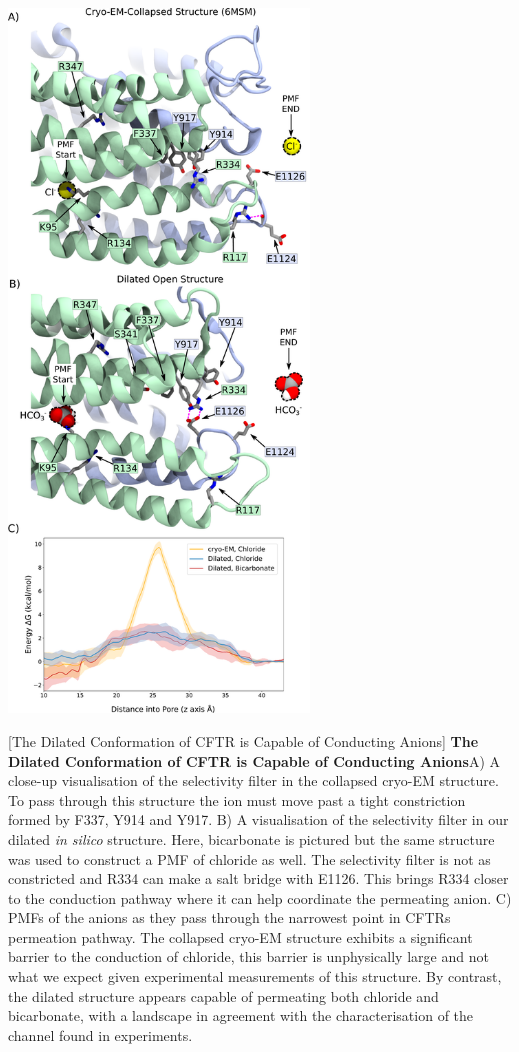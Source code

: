	\begin{center}
		\includegraphics[width=0.6\textwidth]{figures/opening/pmf_fig_1_combined.pdf}
	\end{center}
\begingroup

	\captionsetup{singlelinecheck = false, justification=raggedright}
	[The Dilated Conformation of CFTR is Capable of Conducting Anions] {\textbf{The Dilated Conformation of CFTR is Capable of Conducting Anions}}{A) A close-up visualisation of the selectivity filter in the collapsed cryo-EM structure. To pass through this structure the ion must move past a tight constriction formed by F337, Y914 and Y917. B) A visualisation of the selectivity filter in our dilated \textit{in silico} structure. Here, bicarbonate is pictured but the same structure was used to construct a PMF of chloride as well. The selectivity filter is not as constricted and R334 can make a salt bridge with E1126. This brings R334 closer to the conduction pathway where it can help coordinate the permeating anion. C) PMFs of the anions as they pass through the narrowest point in CFTRs permeation pathway. The collapsed cryo-EM structure exhibits a significant barrier to the conduction of chloride, this barrier is unphysically large and not what we expect given experimental measurements of this structure. By contrast, the dilated structure appears capable of permeating both chloride and bicarbonate, with a landscape in agreement with the characterisation of the channel found in experiments. }
	\label{US_anions}
	\endgroup



